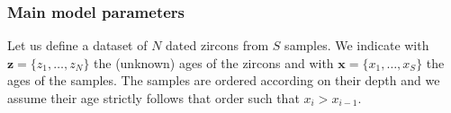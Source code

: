 \documentclass[12pt,letterpaper]{article}
\begin{document}
\begin{flushright}
\end{flushright}
\bigskip
\noindent 

\bigskip
\medskip
\begin{center}


\iffalse
\bigskip
\noindent {\normalsize \sc 
Daniele Silvestro$^{1,2,3,4}$,
}
\noindent {\small \it 


$^1$Department of Biology, University of Fribourg, 1700 Fribourg, Switzerland;\\
$^2$Swiss Institute of Bioinformatics, Quartier Sorge, 1015 Lausanne, Switzerland; \\
$^3$Department of Biological and Environmental Sciences, University of Gothenburg, 413 19 Gothenburg, Sweden;\\
$^4$Gothenburg Global Biodiversity Center, 413 19 Gothenburg, Sweden;\\
}
\fi
\end{center}

\vspace{1.5in}
\subsubsection{Main model parameters}
Let us define a dataset of $N$ dated zircons from $S$ samples. We indicate with $\mathbf{z} = \{z_1, \dots, z_N\}$ the (unknown) ages of the zircons and with $\mathbf{x} = \{x_1, \dots, x_S\}$ the ages of the samples.
The samples are ordered according on their depth and we assume their age strictly follows that order such that $x_{i} > x_{i - 1}$.
\end{document}
